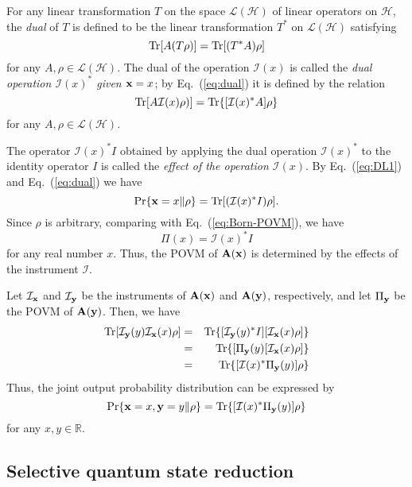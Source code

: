 \documentclass[graybox]{svmult}
\newcommand{\beq}{\begin{equation}}
\newcommand{\eeq}{\end{equation}}
\newcommand{\beql}[1]{\begin{equation}\label{eq:#1}}
\newcommand{\beqa}{\begin{eqnarray}}
\newcommand{\eeqa}{\end{eqnarray}}
\newcommand{\bA}{{\bf A}}
\newcommand{\cH}{{\mathcal H}}
\newcommand{\cI}{{\mathcal I}}
\newcommand{\cL}{{\mathcal L}}
\newcommand{\nn}{\nonumber}
\newcommand{\rh}{\rho}
\newcommand{\tc}{\cL}
\newcommand{\Eq}[1]{Eq.~(\ref{eq:#1})}
\newcommand{\Tr}{\mbox{\rm Tr}}
\newcommand{\bx}{{\bf x}}
\newcommand{\by}{{\bf y}}
\newcommand{\R}{\mathbb{R}}
\begin{document}
For any linear transformation $T$ on the
space $\tc(\cH)$ of linear operators on $\cH$,
the {\em dual} of $T$ is defined to be the linear
transformation $T^{*}$ on  $\cL(\cH)$ satisfying 
\beql{dual}
\Tr[A(T\rh)]=\Tr[(T^{*}A)\rh]
\eeq
for any $A, \rh\in\cL(\cH)$. 
The dual  of the operation $\cI(x)$ is called the 
{\em dual operation $\cI(x)^{*}$ given  $\bx=x$};
by \Eq{dual} it is defined by the relation
\beql{dual-operation}
\Tr[A\cI(x)\rh)]=\Tr\{[\cI(x)^{*}A]\rh\}
\eeq
for any $A, \rh\in\cL(\cH)$.

The operator $\cI(x)^{*}I$ obtained by applying
the dual operation $\cI(x)^{*}$ to the identity operator $I$
is called the {\em effect of the operation $\cI(x)$}.
By \Eq{DL1} and \Eq{dual} we have
\beq
\Pr\{\bx=x\|\rh\}=\Tr[(\cI(x)^{*}I)\rh].
\eeq
Since $\rh$ is arbitrary, comparing with \Eq{Born-POVM},
we have
\beq
\Pi(x)=\cI(x)^{*}I
\eeq
for any real number $x$.  Thus, the POVM of $\bA(\bx)$ is
determined by the effects of the instrument $\cI$.

Let $\cI_{\bx}$ and $\cI_{\by}$ be the instruments of
$\bA(\bx)$ and $\bA(\by)$, respectively, and let $\Pi_{\by}$ be the
POVM of $\bA(\by)$. 
Then, we have
\beqa
\Tr[\cI_{\by}(y)\cI_{\bx}(x)\rh]&=&
\Tr\{[\cI_{\by}(y)^{*}I][\cI_{\bx}(x)\rh]\}\nn\\
&=&
\Tr\{[\Pi_{\by}(y)[\cI_{\bx}(x)\rh]\}\nn\\
&=&
\Tr\{[\cI(x)^{*}\Pi_{\by}(y)]\rh\}
\eeqa
Thus, the joint output probability distribution can be expressed by
\beql{JOPD2}
\Pr\{\bx=x,\by=y\|\rh\}
=\Tr\{[\cI(x)^{*}\Pi_{\by}(y)]\rh\}
\eeq
for any $x,y\in\R$.


\subsection{Selective quantum state reduction}
\end{document}
